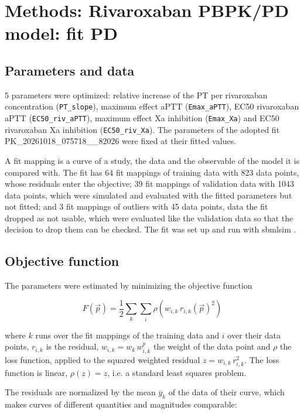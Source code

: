 \section{Methods: Rivaroxaban PBPK/PD model: fit PD}

\subsection{Parameters and data}

5 parameters were optimized: relative increase of the PT per rivaroxaban concentration (\texttt{PT\_slope}), maximum effect aPTT (\texttt{Emax\_aPTT}), EC50 rivaroxaban aPTT (\texttt{EC50\_riv\_aPTT}), maximum effect Xa inhibition (\texttt{Emax\_Xa}) and EC50 rivaroxaban Xa inhibition (\texttt{EC50\_riv\_Xa}). The parameters of the adopted fit PK\_20261018\_075718\_\_82026 were fixed at their fitted values.

A fit mapping is a curve of a study, the data and the observable of the model it is compared with. The fit has 64 fit mappings of training data with 823 data points, whose residuals enter the objective; 39 fit mappings of validation data with 1043 data points, which were simulated and evaluated with the fitted parameters but not fitted; and 3 fit mappings of outliers with 45 data points, data the fit dropped as not usable, which were evaluated like the validation data so that the decision to drop them can be checked. The fit was set up and run with sbmlsim \cite{Koenig2026_sbmlsim}.

\subsection{Objective function}

The parameters were estimated by minimizing the objective function

\begin{equation}
F(\vec{p}) = \frac{1}{2} \sum_{k} \sum_{i} \rho\left(w_{i,k}\, r_{i,k}(\vec{p})^2\right)
\end{equation}

where $k$ runs over the fit mappings of the training data and $i$ over their data points, $r_{i,k}$ is the residual, $w_{i,k} = w_k\, w^{p}_{i,k}$ the weight of the data point and $\rho$ the loss function, applied to the squared weighted residual $z = w_{i,k}\, r_{i,k}^2$. The loss function is linear, $\rho(z) = z$, i.e. a standard least squares problem.

The residuals are normalized by the mean $\overline{y}_k$ of the data of their curve, which makes curves of different quantities and magnitudes comparable:

